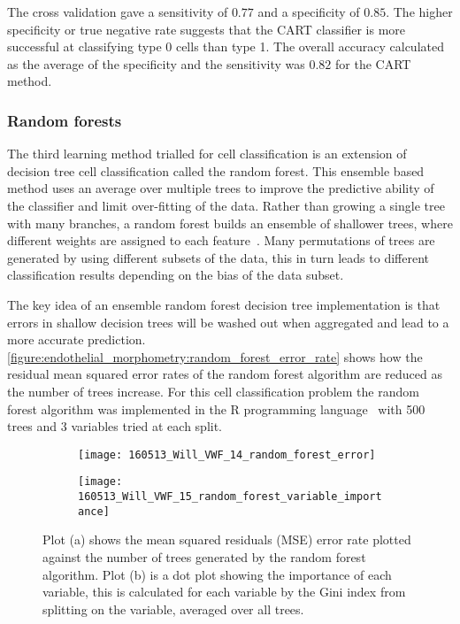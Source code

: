 The cross validation gave a sensitivity of $0.77$ and a specificity of $0.85$. The higher specificity or true negative rate suggests that the CART classifier is more successful at classifying type 0 cells than type 1. The overall accuracy calculated as the average of the specificity and the sensitivity was $0.82$ for the CART method.

\subsubsection{Random forests}
The third learning method trialled for cell classification is an extension of decision tree cell classification called the random forest. This ensemble based method uses an average over multiple trees to improve the predictive ability of the classifier and limit over-fitting of the data. Rather than growing a single tree with many branches, a random forest builds an ensemble of shallower trees, where different weights are assigned to each feature~\cite{Breiman2001}. Many permutations of trees are generated by using different subsets of the data, this in turn leads to different classification results depending on the bias of the data subset.

The key idea of an ensemble random forest decision tree implementation is that errors in shallow decision trees will be washed out when aggregated and lead to a more accurate prediction. \autoref{figure:endothelial_morphometry:random_forest_error_rate} shows how the residual mean squared error rates of the random forest algorithm are reduced as the number of trees increase. For this cell classification problem the random forest algorithm was implemented in the R programming language~\cite{RCoreTeam2014} with 500 trees and 3 variables tried at each split.

\begin{figure}[htbp]\centering
	\begin{subfigure}[b]{0.70\linewidth}
		\centering
		\texttt{[image: 160513\_Will\_VWF\_14\_random\_forest\_error]}
		\caption{}
		\label{figure:endothelial_morphometry:random_forest_error_rate}
	\end{subfigure}
	\begin{subfigure}[b]{0.79\linewidth}
		\centering
		\texttt{[image: 160513\_Will\_VWF\_15\_random\_forest\_variable\_importance]}
		\caption{}
		\label{figure:endothelial_morphometry:random_forest_variable_importance}
	\end{subfigure}
	\caption[Error rate and variable importance in random forest trees]{Plot (a) shows the mean squared residuals (MSE) error rate plotted against the number of trees generated by the random forest algorithm. Plot (b) is a dot plot showing the importance of each variable, this is calculated for each variable by the Gini index from splitting on the variable, averaged over all trees.}
\label{figure:endothelial_morphometry:random_forest_stats}
\end{figure}

